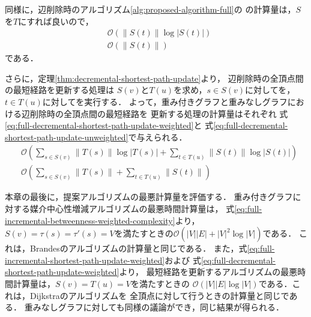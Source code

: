 同様に，辺削除時のアルゴリズム\ref{alg:proposed-algorithm-full}の
の計算量は，$S$を$T$にすれば良いので，
\begin{equation*}
  \begin{aligned}
    &\mathcal{O}\left(\|S(t)\|\log|S(t)|\right) \\
    &\mathcal{O}\left(\|S(t)\|\right)
  \end{aligned}
\end{equation*}
である．

さらに，定理\ref{thm:decremental-shortest-path-update}より，
辺削除時の全頂点間の最短経路を更新する処理は
$S(v)$と$T(u)$を求め，$s\in S(v)$に対してを，
$t\in T(u)$に対してを実行する．
よって，重み付きグラフと重みなしグラフにおける辺削除時の全頂点間の最短経路を
更新する処理の計算量はそれぞれ
式\eqref{eq:full-decremental-shortest-path-update-weighted}と
式\eqref{eq:full-decremental-shortest-path-update-unweighted}で与えられる．
\begin{align}
  &\mathcal{O}\left(\sum_{s\in S(v)}\|T(s)\|\log|T(s)|+\sum_{t\in T(u)}\|S(t)\|\log|S(t)|\right)
  \label{eq:full-decremental-shortest-path-update-weighted} \\
  &\mathcal{O}\left(\sum_{s\in S(v)}\|T(s)\|+\sum_{t\in T(u)}\|S(t)\|\right)
  \label{eq:full-decremental-shortest-path-update-unweighted}
\end{align}

本章の最後に，提案アルゴリズムの最悪計算量を評価する．
重み付きグラフに対する媒介中心性増減アルゴリズムの最悪時間計算量は，
式\eqref{eq:full-incremental-betweenness-weighted-complexity}より，
$S(v)=\tau(s)=\tau'(s)=V$を満たすときの$\mathcal{O}(|V||E|+|V|^2\log|V|)$である．
これは，Brandesのアルゴリズムの計算量と同じである．
また，式\eqref{eq:full-incremental-shortest-path-update-weighted}および
式\eqref{eq:full-decremental-shortest-path-update-weighted}より，
最短経路を更新するアルゴリズムの最悪時間計算量は，$S(v)=T(u)=V$を満たすときの
$\mathcal{O}(|V||E|\log|V|)$である．これは，Dijkstraのアルゴリズムを
全頂点に対して行うときの計算量と同じである．
重みなしグラフに対しても同様の議論ができ，同じ結果が得られる．
